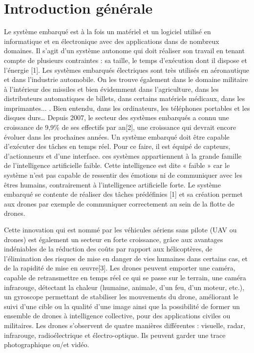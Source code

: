 
\chapter{Introduction générale}
	
Le système embarqué est à la fois un matériel et un logiciel utilisé en informatique et en électronique avec des applications dans de nombreux domaines. Il s'agit d'un système autonome qui doit réaliser son travail en tenant compte de plusieurs contraintes : sa taille, le temps d'exécution dont il dispose et l'énergie [1]. Les systèmes embarqués électriques sont très utilisés en aéronautique et dans l'industrie automobile. On les trouve également dans le domaine militaire à l'intérieur des missiles et bien évidemment dans l’agriculture, dans les distributeurs automatiques de billets, dans certains matériels médicaux, dans les imprimantes... . Bien entendu, dans les ordinateurs, les téléphones portables et les disques durs… Depuis 2007, le secteur des systèmes embarqués a connu une croissance de 9,9\%  de ses effectifs par an[2], une croissance qui devrait encore évoluer dans les prochaines années. Un système embarqué doit être capable d'exécuter des tâches en temps réel. Pour ce faire, il est équipé de capteurs, d'actionneurs et d'une interface. ces systèmes appartiennent à la grande famille de l'intelligence artificielle faible. Cette intelligence est dite « faible » car le système n'est pas capable de ressentir des émotions ni de communiquer avec les êtres humains, contrairement à l'intelligence artificielle forte. Le système embarqué se contente de réaliser des tâches prédéfinies [1] et sa création permet aux drones par exemple de communiquer correctement au sein de la flotte de drones. 



Cette innovation qui est nommé par les véhicules aériens sans pilote (UAV ou drones) est également un secteur en forte croissance, grâce aux avantages indéniables de la réduction des coûts par rapport aux hélicoptères, de l’élimination des risques de mise en danger de vies humaines dans certains cas, et de la rapidité de mise en œuvre[3]. Les drones peuvent emporter une caméra, capable de retransmettre en temps réel ce qui se passe sur le terrain, une caméra infrarouge, détectant la chaleur (humaine, animale, d'un feu, d'un moteur, etc.), un gyroscope permettant de stabiliser les mouvements du drone, améliorant le suivi d'une cible ou la qualité d'une image ainsi que la possibilité de former un ensemble de drones à intelligence collective, pour des applications civiles ou militaires. Les drones s’observent de quatre manières différentes : visuelle, radar, infrarouge, radioélectrique et électro-optique.  Ils peuvent garder une trace photographique ou/et vidéo.



